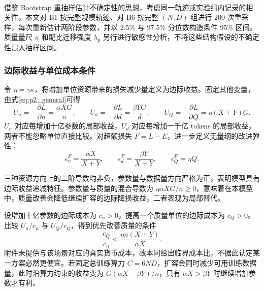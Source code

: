 \documentclass[bwprint]{gmcmthesis}
\numberwithin{equation}{section}
\numberwithin{figure}{section}
\numberwithin{table}{section}
\begin{document}
        借鉴 Bootstrap 重抽样估计不确定性的思想\textsuperscript{\cite{efron1979bootstrap}}，考虑同一轨迹或实验组内记录的相关性，本文对 B1 按完整规模轨迹、对 B6 按完整 $(N,D)$ 组进行 200 次重采样，每次重新估计两阶段参数，并以 2.5\% 与 97.5\% 分位数构造条件 95\% 区间。质量量尺 $\kappa$ 和配比迁移强度 $\lambda_p$ 另行进行敏感性分析，不将这些结构假设的不确定性混入抽样区间。
    
        \subsubsection{边际收益与单位成本条件}  %
        令 $\eta=\gamma\kappa$，将增加单位资源带来的损失减少量定义为边际收益。固定其他变量，由式\eqref{eq:p2_general}可得
        \begin{equation}
         U_n=-\frac{\partial L}{\partial n}=\frac{\alpha XG}{n},\qquad
         U_d=-\frac{\partial L}{\partial d}=\frac{\beta YG}{d},\qquad
         U_Q=-\frac{\partial L}{\partial Q}=\eta(X+Y)G.
         \label{eq:p2_marginal}
        \end{equation}
        $U_n$ 对应每增加十亿参数的局部收益，$U_d$ 对应每增加一千亿 tokens 的局部收益，两者不能忽略单位直接比较。对超额损失 $F=L-E$，进一步定义无量纲的改进弹性：
        \begin{equation}
         \epsilon_n^F=\frac{\alpha X}{X+Y},\qquad
         \epsilon_d^F=\frac{\beta Y}{X+Y},\qquad
         \epsilon_Q^F=\eta Q.
         \label{eq:p2_elasticity}
        \end{equation}
        
        
        三种资源方向上的二阶导数均非负，参数量与数据量方向严格为正，表明模型具有边际收益递减特征。参数量与质量的混合导数为 $\eta\alpha XG/n\geq0$，意味着在本模型中，质量改善会降低继续扩容的边际降损收益，二者表现为局部替代。
        
        设增加十亿参数的边际成本为 $c_n>0$，提高一个质量单位的边际成本为 $c_Q>0$。比较 $U_n/c_n$ 与 $U_Q/c_Q$，得到优先改善质量的条件
        \begin{equation}
         \frac{c_Q}{c_n}<\frac{\eta n(X+Y)}{\alpha X}.
         \label{eq:p2_cost}
        \end{equation}
        附件未提供与该场景对应的真实货币成本，故本问给出临界成本比，不据此认定某一方案必然更便宜。若固定总训练算力 $C=6ND$，扩容会同时减少可用训练数据量，此时沿算力约束的收益变为 $G(\alpha X-\beta Y)/n$，只有 $\alpha X>\beta Y$ 时继续增加参数才有利。
    
\end{document}

